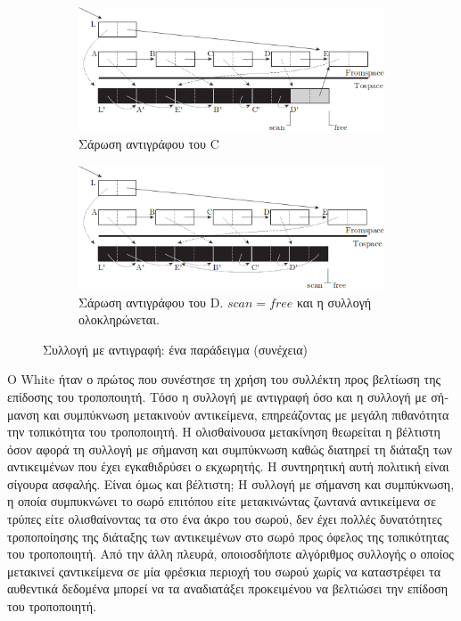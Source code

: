 \begin{greek}
\begin{figure}[H]
  \begin{subfigure}[b]{1.0\textwidth}
    \includegraphics{figures/cop_2b}
    \caption{Σάρωση αντιγράφου του C}
  \end{subfigure}
  
  \begin{subfigure}[b]{1.0\textwidth}
    \includegraphics{figures/cop_2c}
    \caption{Σάρωση αντιγράφου του D. $scan=free$ και η 
             συλλογή ολοκληρώνεται.}
  \end{subfigure}
  \caption{Συλλογή με αντιγραφή: ένα παράδειγμα (συνέχεια)}
  \label{fig:cop_2}
\end{figure}

O White \cite{DBLP:conf/lfp/White80} ήταν ο πρώτος που συνέστησε τη χρήση του συλλέκτη
προς βελτίωση της επίδοσης του τροποποιητή. Τόσο η συλλογή με
αντιγραφή όσο και η συλλογή με σήμανση και συμπύκνωση μετακινούν
αντικείμενα, επηρεάζοντας με μεγάλη πιθανότητα την τοπικότητα
του τροποποιητή. Η ολισθαίνουσα μετακίνηση θεωρείται η βέλτιστη
όσον αφορά τη συλλογή με σήμανση και συμπύκνωση καθώς διατηρεί
τη διάταξη των αντικειμένων που έχει εγκαθιδρύσει ο εκχωρητής.
Η συντηρητική αυτή πολιτική είναι σίγουρα ασφαλής. Είναι όμως
και βέλτιστη; Η συλλογή με σήμανση και συμπύκνωση, η οποία 
συμπυκνώνει το σωρό επιτόπου είτε μετακινώντας ζωντανά αντικείμενα 
σε τρύπες είτε ολισθαίνοντας τα στο ένα άκρο του σωρού, δεν
έχει πολλές δυνατότητες τροποποίησης της διάταξης των αντικειμένων 
στο σωρό προς όφελος της τοπικότητας του τροποποιητή. Από την
άλλη πλευρά, οποιοσδήποτε αλγόριθμος συλλογής ο οποίος μετακινεί 
ςαντικείμενα σε μία φρέσκια περιοχή του σωρού χωρίς να καταστρέφει
τα αυθεντικά δεδομένα μπορεί να τα αναδιατάξει προκειμένου να
βελτιώσει την επίδοση του τροποποιητή.


\end{greek}
